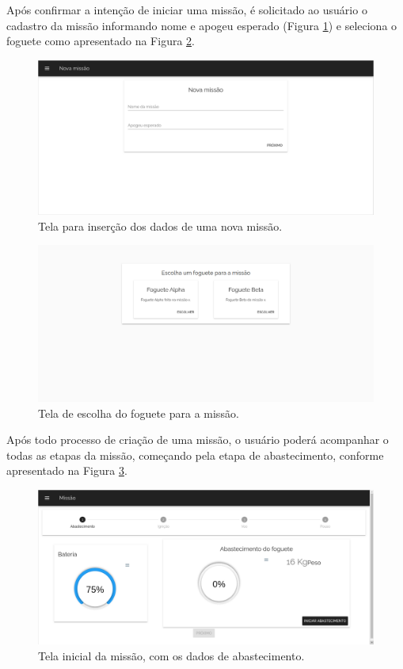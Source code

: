 Após confirmar a intenção de iniciar uma missão, é solicitado ao usuário o cadastro da missão informando nome e apogeu esperado (Figura \ref{fig:dados_missao}) e seleciona o foguete como apresentado na Figura \ref{fig:escolhe_foguete}.
\begin{figure}[h!]
	\centering
		\includegraphics[keepaspectratio=true,scale=0.33]{figuras/telas_software/5.png}
	\caption{Tela para inserção dos dados de uma nova missão.}
	\label{fig:dados_missao}
\end{figure}

\begin{figure}[h!]
	\centering
		\includegraphics[keepaspectratio=true,scale=0.33]{figuras/telas_software/6.png}
	\caption{Tela de escolha do foguete para a missão.}
	\label{fig:escolhe_foguete}
\end{figure}

Após todo processo de criação de uma missão, o usuário poderá acompanhar o todas as etapas da missão, começando pela etapa de abastecimento, conforme apresentado na Figura \ref{fig:inicio_ignicao}.

\begin{figure}[h!]
	\centering
		\includegraphics[keepaspectratio=true,scale=0.33]{figuras/telas_software/7.png}
	\caption{Tela inicial da missão, com os dados de abastecimento.}
	\label{fig:inicio_ignicao}
\end{figure}

